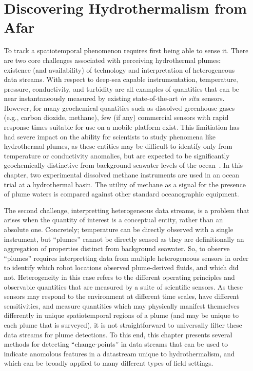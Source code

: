 \chapter{Discovering Hydrothermalism from Afar}
To track a spatiotemporal phenomenon requires first being able to sense it. There are two core challenges associated with perceiving hydrothermal plumes: existence (and availability) of technology and interpretation of heterogeneous data streams. With respect to deep-sea capable instrumentation, temperature, pressure, conductivity, and turbidity are all examples of quantities that can be near instantaneously measured by existing state-of-the-art \emph{in situ} sensors. However, for many geochemical quantities such as dissolved greenhouse gases (e.g., carbon dioxide, methane), few (if any) commercial sensors with rapid response times suitable for use on a mobile platform exist. This limitiation has had severe impact on the ability for scientists to study phenomena like hydrothermal plumes, as these entities may be difficult to identify only from temperature or conductivity anomalies, but are expected to be significantly geochemically distinctive from background seawater levels of the ocean~\autocite{scholz2019shelf,jakuba2007stochastic}. In this chapter, two experimental dissolved methane instruments are used in an ocean trial at a hydrothermal basin. The utility of methane as a signal for the presence of plume waters is compared against other standard oceanographic equipment.

The second challenge, interpretting heterogeneous data streams, is a problem that arises when the quantity of interest is a conceptual entity, rather than an absolute one. Concretely; temperature can be directly observed with a single instrument, but ``plumes'' cannot be directly sensed as they are definitionally an aggregation of properties distinct from background seawater. So, to observe ``plumes'' requires interpretting data from multiple heterogeneous sensors in order to identify which robot locations observed plume-derived fluids, and which did not. Heterogeneity in this case refers to the different operating principles and observable quantities that are measured by a suite of scientific sensors. As these sensors may respond to the environment at different time scales, have different sensitivities, and measure quantities which may physically manifest themselves differently in unique spatiotemporal regions of a plume (and may be unique to each plume that is surveyed), it is not straightforward to universally filter these data streams for plume detections. To this end, this chapter presents several methods for detecting ``change-points'' in data streams that can be used to indicate anomolous features in a datastream unique to hydrothermalism, and which can be broadly applied to many different types of field settings.

